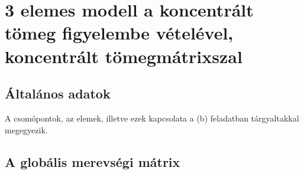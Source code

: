 \section{3 elemes modell a koncentrált tömeg figyelembe vételével, koncentrált tömegmátrixszal}

\subsection{Általános adatok}

A csomópontok, az elemek, illetve ezek kapcsolata a (b) feladatban
tárgyaltakkal megegyezik.

\subsection{A globális merevségi mátrix}

